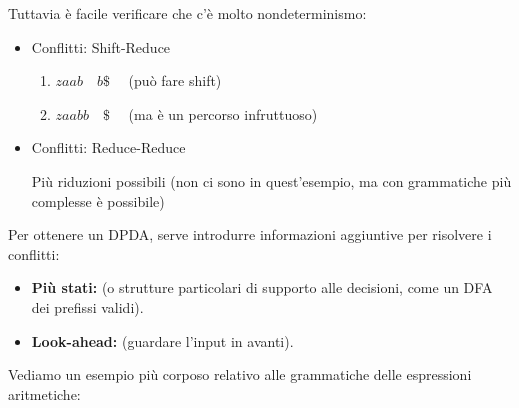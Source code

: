 {Tuttavia  è facile verificare che c'è molto nondeterminismo:
\begin{itemize}
    \item Conflitti: Shift-Reduce
    \begin{enumerate}
        \item $zaab \quad b\$ \quad$ (può fare shift)
        \item $zaabb \quad \$ \quad$ (ma è un percorso infruttuoso)
    \end{enumerate}
    \item Conflitti: Reduce-Reduce
    
    Più riduzioni possibili (non ci sono in quest'esempio, ma con grammatiche più complesse è possibile)

\end{itemize}
}

Per ottenere un DPDA, serve introdurre informazioni aggiuntive per risolvere i conflitti:
\begin{itemize}
    \item \textbf{Più stati:} (o strutture particolari di supporto alle decisioni, come un DFA dei prefissi validi).
    \item \textbf{Look-ahead:} (guardare l'input in avanti).
\end{itemize}

Vediamo un esempio più corposo relativo alle grammatiche delle espressioni aritmetiche:

